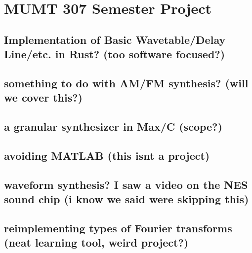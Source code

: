\documentclass[
  ignorenonframetext,
]{beamer}
\author{}
\date{}
\begin{document}
\hypertarget{mumt-307-semester-project}{%
\section{MUMT 307 Semester Project}\label{mumt-307-semester-project}}

\hypertarget{implementation-of-basic-wavetabledelay-lineetc.-in-rust-too-software-focused}{%
\subsection{Implementation of Basic Wavetable/Delay Line/etc. in Rust?
(too software
focused?)}\label{implementation-of-basic-wavetabledelay-lineetc.-in-rust-too-software-focused}}

\hypertarget{something-to-do-with-amfm-synthesis-will-we-cover-this}{%
\subsection{something to do with AM/FM synthesis? (will we cover
this?)}\label{something-to-do-with-amfm-synthesis-will-we-cover-this}}

\hypertarget{a-granular-synthesizer-in-maxc-scope}{%
\subsection{a granular synthesizer in Max/C
(scope?)}\label{a-granular-synthesizer-in-maxc-scope}}

\hypertarget{avoiding-matlab-this-isnt-a-project}{%
\subsection{avoiding MATLAB (this isn\textquotesingle t a
project)}\label{avoiding-matlab-this-isnt-a-project}}

\hypertarget{waveform-synthesis-i-saw-a-video-on-the-nes-sound-chip-i-know-we-said-were-skipping-this}{%
\subsection{waveform synthesis? I saw a video on the NES sound chip (i
know we said we\textquotesingle re skipping
this)}\label{waveform-synthesis-i-saw-a-video-on-the-nes-sound-chip-i-know-we-said-were-skipping-this}}

\hypertarget{reimplementing-types-of-fourier-transforms-neat-learning-tool-weird-project}{%
\subsection{reimplementing types of Fourier transforms (neat learning
tool, weird
project?)}\label{reimplementing-types-of-fourier-transforms-neat-learning-tool-weird-project}}
\end{document}
